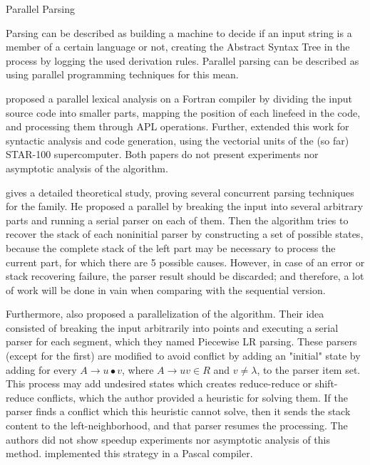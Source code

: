 \begin{section}{Parallel Parsing}

Parsing can be
described as building a machine to decide if an input string is a member of a
certain language or not, creating the Abstract Syntax Tree in the process by
logging the used derivation rules. Parallel parsing can be described as using
parallel programming techniques for this mean.


\cite{Lincoln:1970:PPT:987475.987478} proposed a parallel lexical analysis on a
Fortran compiler by dividing the input source code into smaller parts, mapping
the position of each linefeed in the code, and processing them through APL
operations. Further, \cite{Krohn:1975:PAC:390015.808414} extended this work for
syntactic analysis and code generation, using the vectorial units of the (so
far) STAR-100 supercomputer. Both papers do not present experiments nor
asymptotic analysis of the algorithm.

\cite{fischer1975parsing} gives a detailed theoretical study, proving several
concurrent parsing techniques for the  family. He proposed a parallel
 by breaking the input into several arbitrary parts and running a serial
parser on each of them. Then the algorithm tries to recover the stack of each
noninitial parser by constructing a set of possible states, because the
complete stack of the left part may be necessary to process the current part,
for which there are 5 possible causes. However, in case of an error or stack
recovering failure, the parser result should be discarded; and therefore, a lot
of work will be done in vain when comparing with the sequential version.

Furthermore, \cite{Mickunas:1978:PCM:800127.804105} also proposed a
parallelization of the  algorithm. Their idea consisted of breaking the
input arbitrarily into points and executing a serial parser for each segment,
which they named Piecewise LR parsing. These parsers (except for the first) are
modified to avoid conflict by adding an "initial" state by adding for every $A
\rightarrow u \bullet v$, where $A \rightarrow uv \in R$ and $v \neq \lambda$,
to the parser item set. This process may add undesired states which creates
reduce-reduce or shift-reduce conflicts, which the author provided a heuristic
for solving them.  If the parser finds a conflict which this heuristic cannot
solve, then it sends the stack content to the left-neighborhood, and that
parser resumes the processing. The authors did not show speedup experiments nor
asymptotic analysis of this method.  \cite{Pennello:1978:FMA:512760.512786}
implemented this strategy in a Pascal compiler.


\end{section}
